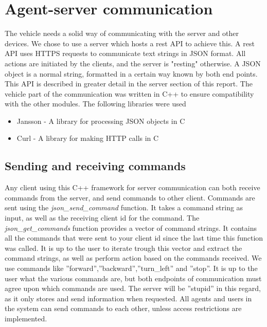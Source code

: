 \section{Agent-server communication}
The vehicle needs a solid way of communicating with the server and other devices. 
We chose to use a server which hosts a rest API to achieve this. 
A rest API uses HTTPS requests to communicate text strings in JSON format. All actions are initiated by the clients, and the server is "resting" otherwise. 
A JSON object is a normal string, formatted in a certain way known by both end points.
This API is described in greater detail in the server section of this report. The vehicle part of the communication was written in C++ to ensure compatibility with the other modules. The following libraries were used
\begin{itemize}
    \item Jansson - A library for processing JSON objects in C
    \item Curl - A library for making HTTP calls in C
\end{itemize}

\subsection{Sending and receiving commands}
Any client using this C++ framework for server communication can both receive commands from the server, and send commands to other client.
Commands are sent using the \textit{json\_send\_command} function. It takes a command string as input, as well as the receiving client id for the command.
The \textit{json\_get\_commands} function provides a vector of command strings. It contains all the commands that were sent to your client id since the last time this function was called. 
It is up to the user to iterate trough this vector and extract the command strings, as well as perform action based on the commands received. 
We use commands like ''forward'',''backward'',''turn\_left'' and ''stop''. It is up to the user what the various commands are, but both endpoints of communication must agree upon which commands are used. The server will be ''stupid'' in this regard, as it only stores and send information when requested. 
All agents and users in the system can send commands to each other, unless access restrictions are implemented.

